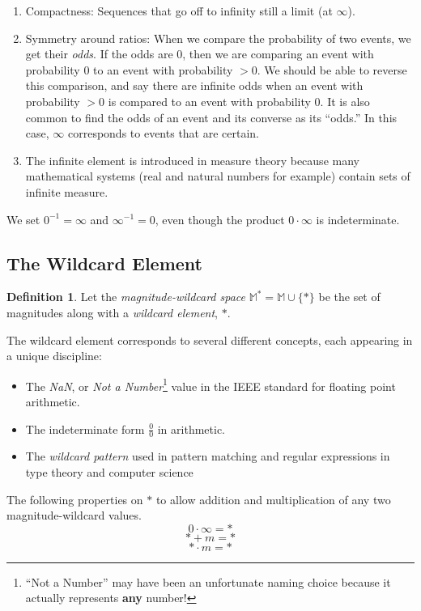 \documentclass[twoside]{article}
\newcommand{\quotes}[1]{``#1''}
\theoremstyle{plain}%
\theoremstyle{definition}
\newtheorem{definition}{Definition}[section]
\theoremstyle{remark}
\begin{document}
\begin{enumerate}
\item Compactness: Sequences that go off to infinity still a limit (at \(\infty\)).
\item Symmetry around ratios: When we compare the probability of two events, we get their \textit{odds}. If the odds are 0, then we are comparing an event with probability 0 to an event with probability \(>0\). We should be able to reverse this comparison, and say there are infinite odds when an event with probability \(>0\) is compared to an event with probability 0. It is also common to find the odds of an event and its converse as its \quotes{odds.} In this case, \(\infty\) corresponds to events that are certain.
\item The infinite element is introduced in measure theory because many mathematical systems (real and natural numbers for example) contain sets of infinite measure.
\end{enumerate}

We set \(0^{-1} = \infty\) and \(\infty^{-1} = 0\), even though the product \(0 \cdot \infty\) is indeterminate.

\subsection{The Wildcard Element}

\begin{definition}
Let the \textit{magnitude-wildcard space} \(\mathbb{M}^*= \mathbb{M} \cup \{\ast\}\) be the set of magnitudes along with a \textit{wildcard element}, \(\ast\).
\end{definition}

The wildcard element corresponds to several different concepts, each appearing in a unique discipline:
\begin{itemize}
  \item The \textit{NaN}, or \textit{Not a Number}\footnote{\quotes{Not a Number} may have been an unfortunate naming choice because it actually represents \textbf{any} number!} value in the IEEE standard for floating point arithmetic\cite{ieee}.
  \item The indeterminate form \(\frac{0}{0}\) in arithmetic.
  \item The \textit{wildcard pattern} used in pattern matching and regular expressions in type theory and computer science
\end{itemize}

The following properties on \(\ast\) to allow addition and multiplication of any two magnitude-wildcard values.
\[0 \cdot \infty = \ast\]
\[\ast + m = \ast\]
\[\ast \cdot m = \ast\]
\end{document}

